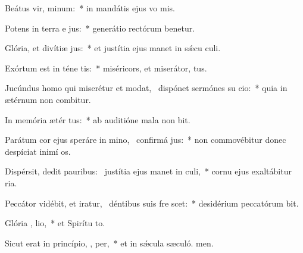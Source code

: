 \item Beátus vir,   minum:~* in mandátis ejus vo mis.
\item Potens in terra e  jus:~* generátio rectórum benetur.
\item Glória, et divítiæ   jus:~* et justítia ejus manet in sǽcu culi.
\item Exórtum est in téne  tis:~* miséricors, et miserátor,  tus.
\item Jucúndus homo qui miserétur et modat,~\pscross{} dispónet sermónes su  cio:~* quia in ætérnum non combitur.
\item In memória ætér  tus:~* ab auditióne mala non bit.
\item Parátum cor ejus speráre in mino,~\pscross{} confirmá   jus:~* non commovébitur donec despíciat inimí os.
\item Dispérsit, dedit pauribus:~\pscross{} justítia ejus manet in  culi,~* cornu ejus exaltábitur  ria.
\item Peccátor vidébit, et iratur,~\pscross{} déntibus suis fre  scet:~* desidérium peccatórum bit.
\item Glória ,  lio,~* et Spirítu to.
\item Sicut erat in princípio,  ,  per,~* et in sǽcula sæculó. men.
